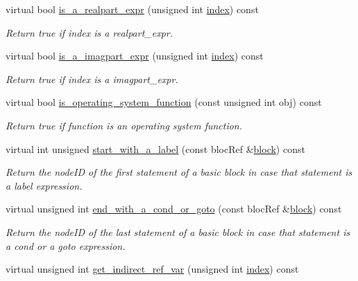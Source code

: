 \begin{DoxyCompactItemize}
virtual bool \hyperlink{classBehavioralHelper_adeb3d0584527e099e99da968a854b2d3}{is\+\_\+a\+\_\+realpart\+\_\+expr} (unsigned int \hyperlink{tutorial__pact__2019_2Introduction_2third_2include_2Keccak_8h_a028c9bdc8344cca38ab522a337074797}{index}) const
\begin{DoxyCompactList}\small\item\em Return true if index is a realpart\+\_\+expr. \end{DoxyCompactList}\item 
virtual bool \hyperlink{classBehavioralHelper_a4b2f7003179491ea4236e2cbb64fd2d9}{is\+\_\+a\+\_\+imagpart\+\_\+expr} (unsigned int \hyperlink{tutorial__pact__2019_2Introduction_2third_2include_2Keccak_8h_a028c9bdc8344cca38ab522a337074797}{index}) const
\begin{DoxyCompactList}\small\item\em Return true if index is a imagpart\+\_\+expr. \end{DoxyCompactList}\item 
virtual bool \hyperlink{classBehavioralHelper_a07a49444e63eee25cda5f42f273d1b25}{is\+\_\+operating\+\_\+system\+\_\+function} (const unsigned int obj) const
\begin{DoxyCompactList}\small\item\em Return true if function is an operating system function. \end{DoxyCompactList}\item 
virtual int unsigned \hyperlink{classBehavioralHelper_a2d87c9daa2632ea995500bb7d5c14efd}{start\+\_\+with\+\_\+a\+\_\+label} (const bloc\+Ref \&\hyperlink{structblock}{block}) const
\begin{DoxyCompactList}\small\item\em Return the node\+ID of the first statement of a basic block in case that statement is a label expression. \end{DoxyCompactList}\item 
virtual unsigned int \hyperlink{classBehavioralHelper_a9f4fe1300d7b260198d907674c784fb2}{end\+\_\+with\+\_\+a\+\_\+cond\+\_\+or\+\_\+goto} (const bloc\+Ref \&\hyperlink{structblock}{block}) const
\begin{DoxyCompactList}\small\item\em Return the node\+ID of the last statement of a basic block in case that statement is a cond or a goto expression. \end{DoxyCompactList}\item 
virtual unsigned int \hyperlink{classBehavioralHelper_a810664b0f87645d004da4848ef574974}{get\+\_\+indirect\+\_\+ref\+\_\+var} (unsigned int \hyperlink{tutorial__pact__2019_2Introduction_2third_2include_2Keccak_8h_a028c9bdc8344cca38ab522a337074797}{index}) const

\end{DoxyCompactItemize}
